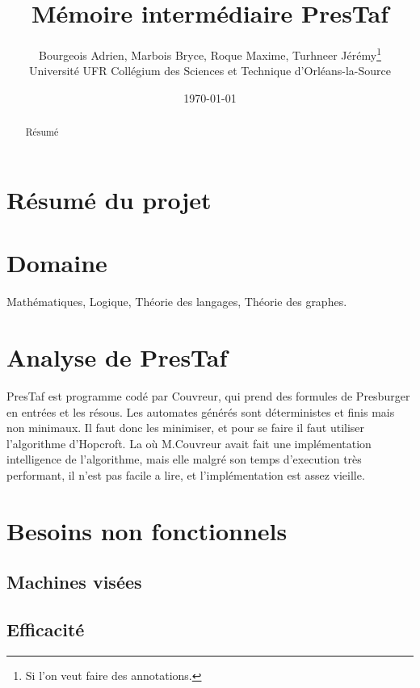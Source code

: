 \documentclass{article}%
\begin{document}
\title{M\'emoire interm\'ediaire PresTaf}
\author{Bourgeois Adrien, Marbois Bryce, Roque Maxime, Turhneer J\'er\'emy\thanks{Si l'on veut faire des annotations.}
\\Universit\'e UFR Coll\'egium des Sciences et Technique d'Orl\'eans-la-Source}
\date{\today}
\maketitle

\begin{abstract}
R\'esum\'e
\end{abstract}

\tableofcontents

\section{R\'esum\'e du projet}

\section{Domaine}

Mathématiques, Logique, Théorie des langages, Théorie des graphes.

\section{Analyse de PresTaf}

PresTaf est programme cod\'e par Couvreur, qui prend des formules de Presburger en entr\'ees et les r\'esous. Les automates g\'en\'er\'es sont d\'eterministes et finis mais non minimaux. Il faut donc les minimiser, et pour se faire il faut utiliser l'algorithme d'Hopcroft. La o\`u M.Couvreur avait fait une impl\'ementation intelligence de l'algorithme, mais elle malgr\'e son temps d'execution tr\`es performant, il n'est pas facile a lire, et l'impl\'ementation est assez vieille.

\section{Besoins non fonctionnels}

\subsection{Machines visées}

\subsection{Efficacité}
\end{document}
